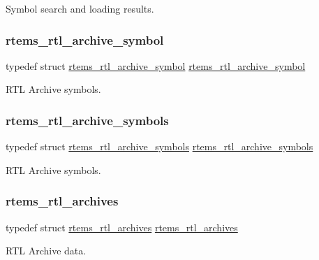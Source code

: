 Symbol search and loading results. \mbox{\label{rtl-archive_8h_a69d21ffb4c0f3127b437d52c875367df}} 
\subsubsection{\texorpdfstring{rtems\_rtl\_archive\_symbol}{rtems\_rtl\_archive\_symbol}}
{\footnotesize\ttfamily typedef struct \mbox{\hyperlink{structrtems__rtl__archive__symbol}{rtems\+\_\+rtl\+\_\+archive\+\_\+symbol}}  \mbox{\hyperlink{structrtems__rtl__archive__symbol}{rtems\+\_\+rtl\+\_\+archive\+\_\+symbol}}}

R\+TL Archive symbols. \mbox{\label{rtl-archive_8h_ad022b9e84a86a706474c33ea6220b0b4}} 
\subsubsection{\texorpdfstring{rtems\_rtl\_archive\_symbols}{rtems\_rtl\_archive\_symbols}}
{\footnotesize\ttfamily typedef struct \mbox{\hyperlink{structrtems__rtl__archive__symbols}{rtems\+\_\+rtl\+\_\+archive\+\_\+symbols}}  \mbox{\hyperlink{structrtems__rtl__archive__symbols}{rtems\+\_\+rtl\+\_\+archive\+\_\+symbols}}}

R\+TL Archive symbols. \mbox{\label{rtl-archive_8h_a1ed360f6d4f5a5b50228f5e899b9af77}} 
\subsubsection{\texorpdfstring{rtems\_rtl\_archives}{rtems\_rtl\_archives}}
{\footnotesize\ttfamily typedef struct \mbox{\hyperlink{structrtems__rtl__archives}{rtems\+\_\+rtl\+\_\+archives}}  \mbox{\hyperlink{structrtems__rtl__archives}{rtems\+\_\+rtl\+\_\+archives}}}

R\+TL Archive data. 

